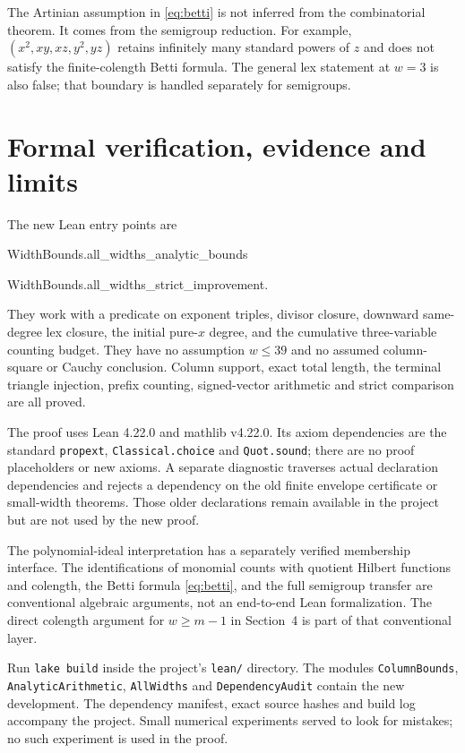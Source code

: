 \documentclass[11pt,a4paper]{article}
\begin{document}
The Artinian assumption in \eqref{eq:betti} is not inferred from the combinatorial theorem. It comes from the semigroup reduction. For example, $(x^2,xy,xz,y^2,yz)$ retains infinitely many standard powers of $z$ and does not satisfy the finite-colength Betti formula. The general lex statement at $w=3$ is also false; that boundary is handled separately for semigroups.

\section{Formal verification, evidence and limits}\label{sec:formal}
The new Lean entry points are
\begin{center}\ttfamily
WidthBounds.all\_widths\_analytic\_bounds\par
WidthBounds.all\_widths\_strict\_improvement.
\end{center}
They work with a predicate on exponent triples, divisor closure, downward same-degree lex closure, the initial pure-$x$ degree, and the cumulative three-variable counting budget. They have no assumption $w\le39$ and no assumed column-square or Cauchy conclusion. Column support, exact total length, the terminal triangle injection, prefix counting, signed-vector arithmetic and strict comparison are all proved.

The proof uses Lean 4.22.0 and mathlib v4.22.0. Its axiom dependencies are the standard \texttt{propext}, \texttt{Classical.choice} and \texttt{Quot.sound}; there are no proof placeholders or new axioms. A separate diagnostic traverses actual declaration dependencies and rejects a dependency on the old finite envelope certificate or small-width theorems. Those older declarations remain available in the project but are not used by the new proof.

The polynomial-ideal interpretation has a separately verified membership interface. The identifications of monomial counts with quotient Hilbert functions and colength, the Betti formula \eqref{eq:betti}, and the full semigroup transfer are conventional algebraic arguments, not an end-to-end Lean formalization. The direct colength argument for $w\ge m-1$ in Section~4 is part of that conventional layer.

Run \texttt{lake build} inside the project's \texttt{lean/} directory. The modules \texttt{ColumnBounds}, \texttt{AnalyticArithmetic}, \texttt{AllWidths} and \texttt{DependencyAudit} contain the new development. The dependency manifest, exact source hashes and build log accompany the project. Small numerical experiments served to look for mistakes; no such experiment is used in the proof.
\end{document}
